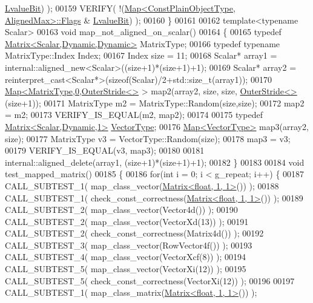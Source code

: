 \begin{DoxyCode}
      \hyperlink{group__flags_gae2c323957f20dfdc6cb8f44428eaec1a}{LvalueBit}) );
00159   VERIFY( !(\hyperlink{group___core___module_class_eigen_1_1_map}{Map<ConstPlainObjectType, AlignedMax>::Flags} & 
      \hyperlink{group__flags_gae2c323957f20dfdc6cb8f44428eaec1a}{LvalueBit}) );
00160 \}
00161 
00162 \textcolor{keyword}{template}<\textcolor{keyword}{typename} Scalar>
00163 \textcolor{keywordtype}{void} map\_not\_aligned\_on\_scalar()
00164 \{
00165   \textcolor{keyword}{typedef} \hyperlink{group___core___module}{Matrix<Scalar,Dynamic,Dynamic>} MatrixType;
00166   \textcolor{keyword}{typedef} \textcolor{keyword}{typename} MatrixType::Index Index;
00167   Index size = 11;
00168   Scalar* array1 = internal::aligned\_new<Scalar>((size+1)*(size+1)+1);
00169   Scalar* array2 = \textcolor{keyword}{reinterpret\_cast<}Scalar*\textcolor{keyword}{>}(\textcolor{keyword}{sizeof}(Scalar)/2+std::size\_t(array1));
00170   \hyperlink{group___core___module_class_eigen_1_1_map}{Map<MatrixType,0,OuterStride<>} > map2(array2, size, size, 
      \hyperlink{class_eigen_1_1_outer_stride}{OuterStride<>}(size+1));
00171   MatrixType m2 = MatrixType::Random(size,size);
00172   map2 = m2;
00173   VERIFY\_IS\_EQUAL(m2, map2);
00174   
00175   \textcolor{keyword}{typedef} \hyperlink{group___core___module}{Matrix<Scalar,Dynamic,1>} \hyperlink{struct_vector_type}{VectorType};
00176   \hyperlink{group___core___module_class_eigen_1_1_map}{Map<VectorType>} map3(array2, size);
00177   MatrixType v3 = VectorType::Random(size);
00178   map3 = v3;
00179   VERIFY\_IS\_EQUAL(v3, map3);
00180   
00181   internal::aligned\_delete(array1, (size+1)*(size+1)+1);
00182 \}
00183 
00184 \textcolor{keywordtype}{void} test\_mapped\_matrix()
00185 \{
00186   \textcolor{keywordflow}{for}(\textcolor{keywordtype}{int} i = 0; i < g\_repeat; i++) \{
00187     CALL\_SUBTEST\_1( map\_class\_vector(\hyperlink{group___core___module_class_eigen_1_1_matrix}{Matrix<float, 1, 1>}()) );
00188     CALL\_SUBTEST\_1( check\_const\_correctness(\hyperlink{group___core___module_class_eigen_1_1_matrix}{Matrix<float, 1, 1>}()) );
00189     CALL\_SUBTEST\_2( map\_class\_vector(Vector4d()) );
00190     CALL\_SUBTEST\_2( map\_class\_vector(VectorXd(13)) );
00191     CALL\_SUBTEST\_2( check\_const\_correctness(Matrix4d()) );
00192     CALL\_SUBTEST\_3( map\_class\_vector(RowVector4f()) );
00193     CALL\_SUBTEST\_4( map\_class\_vector(VectorXcf(8)) );
00194     CALL\_SUBTEST\_5( map\_class\_vector(VectorXi(12)) );
00195     CALL\_SUBTEST\_5( check\_const\_correctness(VectorXi(12)) );
00196 
00197     CALL\_SUBTEST\_1( map\_class\_matrix(\hyperlink{group___core___module_class_eigen_1_1_matrix}{Matrix<float, 1, 1>}()) );

\end{DoxyCode}
